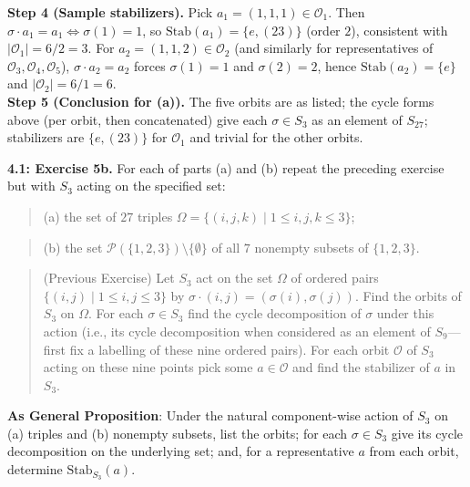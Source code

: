 \documentclass[11pt]{article}
\theoremstyle{definition}
\begin{document}
\textbf{Step 4 (Sample stabilizers).} Pick $a_1=(1,1,1)\in\mathcal O_1$. Then $\sigma\cdot a_1=a_1\iff\sigma(1)=1$, so $\mathrm{Stab}(a_1)=\{e,(23)\}$ (order $2$), consistent with $|\mathcal O_1|=6/2=3$. For $a_2=(1,1,2)\in\mathcal O_2$ (and similarly for representatives of $\mathcal O_3,\mathcal O_4,\mathcal O_5$), $\sigma\cdot a_2=a_2$ forces $\sigma(1)=1$ and $\sigma(2)=2$, hence $\mathrm{Stab}(a_2)=\{e\}$ and $|\mathcal O_2|=6/1=6$.\\
\textbf{Step 5 (Conclusion for (a)).} The five orbits are as listed; the cycle forms above (per orbit, then concatenated) give each $\sigma\in S_3$ as an element of $S_{27}$; stabilizers are $\{e,(23)\}$ for $\mathcal O_1$ and trivial for the other orbits.\\

\newpage

\noindent \textbf{4.1: Exercise 5b.} For each of parts (a) and (b) repeat the preceding exercise but with $S_3$ acting on the specified set:\\

\begin{quote}
(a) the set of $27$ triples $\Omega=\{(i,j,k)\mid 1\le i,j,k\le 3\}$;
\end{quote}

\begin{quote}
(b) the set $\mathcal P(\{1,2,3\})\setminus\{\emptyset\}$ of all $7$ nonempty subsets of $\{1,2,3\}$.
\end{quote} %

\begin{quote} 

(Previous Exercise) Let $S_3$ act on the set $\Omega$ of ordered pairs $\{(i,j)\mid 1\le i,j\le 3\}$ by $\sigma\!\cdot\!(i,j)=(\sigma(i),\sigma(j))$. Find the orbits of $S_3$ on $\Omega$. For each $\sigma\in S_3$ find the cycle decomposition of $\sigma$ under this action (i.e., its cycle decomposition when considered as an element of $S_9$—first fix a labelling of these nine ordered pairs). For each orbit $\mathcal O$ of $S_3$ acting on these nine points pick some $a\in\mathcal O$ and find the stabilizer of $a$ in $S_3$.\\ %

\end{quote}

\noindent\textbf{As General Proposition}: Under the natural component-wise action of $S_3$ on (a) triples and (b) nonempty subsets, list the orbits; for each $\sigma\in S_3$ give its cycle decomposition on the underlying set; and, for a representative $a$ from each orbit, determine $\mathrm{Stab}_{S_3}(a)$.\\
\end{document}
